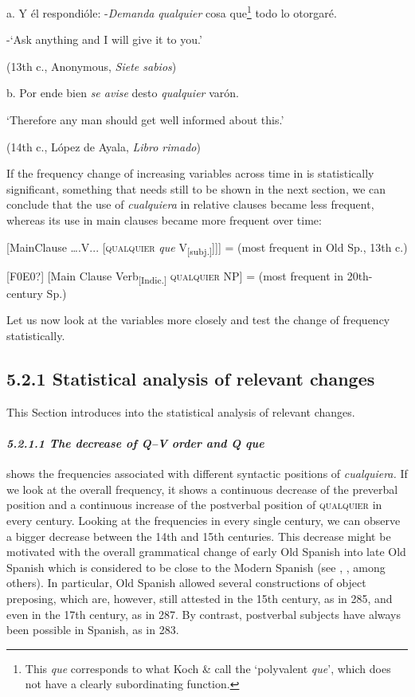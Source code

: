   a.  Y él respondióle: -\textit{Demanda} \textit{qualquier} cosa que\footnote{This \textit{que} corresponds to what Koch \& \citet[99]{Oesterreicher1990} call the ‘polyvalent \textit{que}’, which does not have a clearly subordinating function.} todo lo otorgaré. 

{}-‘Ask anything and I will give it to you.’

    (13th c., Anonymous, \textit{Siete sabios})

  b.   Por ende bien \textit{se avise} desto \textit{qualquier} varón. 

    ‘Therefore any man should get well informed about this.’

    (14th c., López de Ayala, \textit{Libro rimado})

If the frequency change of increasing variables across time in  is statistically significant, something that needs still to be shown in the next section, we can conclude that the use of \textit{cualquiera} in relative clauses became less frequent, whereas its use in main clauses became more frequent over time:

  [MainClause ….V... [\textsc{qualquier} \textit{que} V\textsubscript{[subj.]}]]] = (most frequent in Old Sp., 13th c.)

  [F0E0?] [Main Clause Verb\textsubscript{[Indic.]} \textsc{qualquier} NP] = (most frequent in 20th-century Sp.)

Let us now look at the variables more closely and test the change of frequency statistically.

\subsection{\textbf{5.2.1} \textbf{Statistical} \textbf{analysis} \textbf{of} \textbf{relevant} \textbf{changes}}

This Section introduces into the statistical analysis of relevant changes.

\paragraph{\textit{5.2.1.1 The decrease of Q–V order and Q que}}

 shows the frequencies associated with different syntactic positions of \textit{cualquiera.} If we look at the overall frequency, it shows a continuous decrease of the preverbal position and a continuous increase of the postverbal position of \textsc{qualquier} in every century. Looking at the frequencies in every single century, we can observe a bigger decrease between the 14th and 15th centuries. This decrease might be motivated with the overall grammatical change of early Old Spanish into late Old Spanish which is considered to be close to the Modern Spanish (see \citealt{Ariza1998}, \citealt{Penny1993}, among others). In particular, Old Spanish allowed several constructions of object preposing, which are, however, still attested in the 15th century, as in 285, and even in the 17th century, as in 287. By contrast, postverbal subjects have always been possible in Spanish, as in 283.


